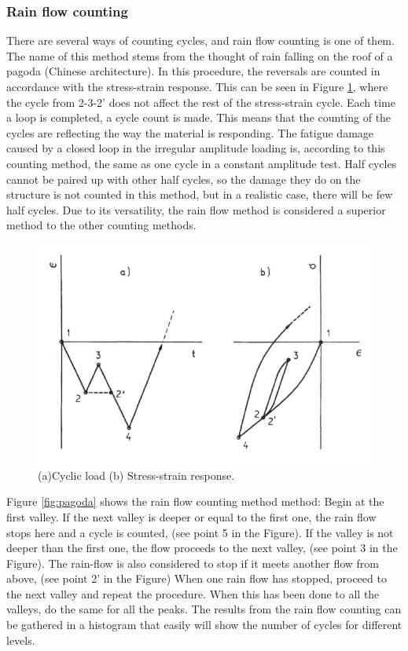 \subsubsection{Rain flow counting}
\label{sec:rainflow}
There are several ways of counting cycles, and rain flow counting is one of them. The name of this method stems from the thought of rain falling on the roof of a pagoda (Chinese architecture). In this procedure, the reversals are counted in accordance with the stress-strain response. This can be seen in Figure \ref{fig:count}, where the cycle from 2-3-2' does not affect the rest of the stress-strain cycle. Each time a loop is completed, a cycle count is made. This means that the counting of the cycles are reflecting the way the material is responding. The fatigue damage caused by a closed loop in the irregular amplitude loading is, according to this counting method, the same as one cycle in a constant amplitude test. Half cycles cannot be paired up with other half cycles, so the damage they do on the structure is not counted in this method, but in a realistic case, there will be few half cycles. Due to its versatility, the rain flow method is considered a superior method to the other counting methods. 

\begin{figure}[H]
\centering
\includegraphics[scale=0.6]{figures/count}
\caption[$\; \:$Cyclic load and stress-strain response]{(a)Cyclic load (b) Stress-strain response.   \cite{fatigue2016} }
 \label{fig:count}
\end{figure}

\noindent Figure \ref{fig:pagoda} shows the rain flow counting method method:\newline 
\newline
Begin at the first valley. If the next valley is deeper or equal to the first one, the rain flow stops here and a cycle is counted, (see point 5 in the Figure). If the valley is not deeper than the first one, the flow proceeds to the next valley, (see point 3 in the Figure). The rain-flow is also considered to stop if it meets another flow from above, (see point 2' in the Figure) When one rain flow has stopped, proceed to the next valley and repeat the procedure. When this has been done to all the valleys, do the same for all the peaks. The results from the rain flow counting can be gathered in a histogram that easily will show the number of cycles for different levels. 

